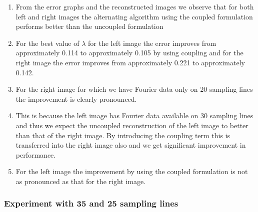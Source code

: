 \begin{enumerate}
\item From the error graphs and the reconstructed images we observe that for both left and right images the alternating algorithm using the coupled formulation performs better than the uncoupled formulation
\item For the best value of $\lambda$ for the left image the error improves from approximately 0.114 to approximately 0.105 by using coupling and for the right image the error improves from approximately 0.221 to approximately 0.142.
\item For the right image for which we have Fourier data only on 20 sampling lines the improvement is clearly pronounced.
\item This is because the left image has Fourier data available on 30 sampling lines and thus we expect the uncoupled reconstruction of the left image to better than that of the right image. By introducing the coupling term this is transferred into the right image also and we get significant improvement in performance.
\item For the left image the improvement by using the coupled formulation is not as pronounced as that for the right image.
\end{enumerate}

\subsubsection{Experiment with 35 and 25 sampling lines}

